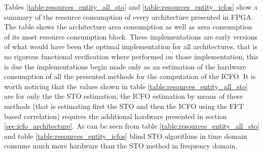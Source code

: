 
Tables \ref{table:resources_entity_all_sto} and \ref{table:resources_entity_icfos} show a summary of the resource consumption of every architecture presented in FPGA. The table shows the architecture area consumption as well as area consumption of its most resource consumption block. These implementations are early versions of what would have been the optimal implementation for all architectures, that is no rigorous functional verification where performed on those implementation, this is due the implementations begin made only as an estimation of the hardware consumption of all the presented methods for the computation of the ICFO. It is worth noticing that the values shown in table \ref{table:resources_entity_all_sto} are for only the the STO estimation, the ICFO estimation by means of these methods (that is estimating first the STO and then the ICFO using the FFT based correlation) requires the additional hardware presented in section \ref{sec:icfo_architecture}. As can be seen from table \ref{table:resources_entity_all_sto} and table \ref{table:resources_entity_icfos} blind STO algorithms in time domain consume much more hardware than the STO method in frequency domain.  


